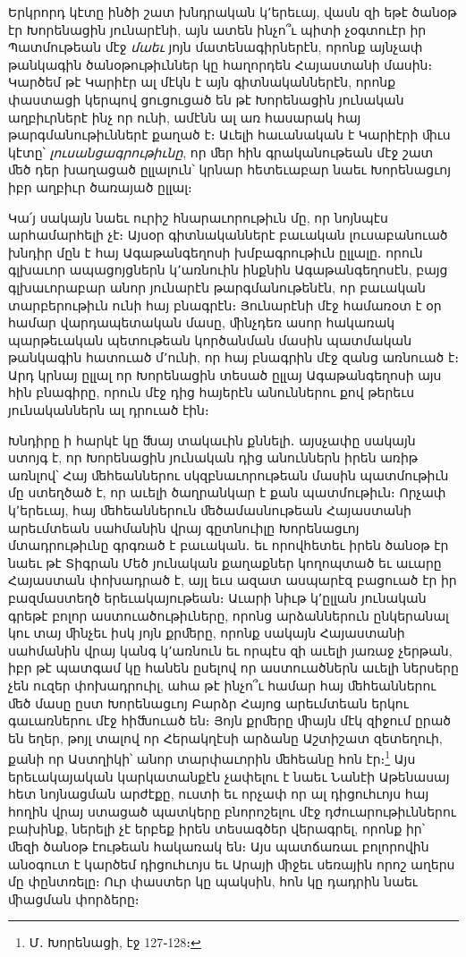 \documentclass{article}
\begin{document}
{Երկրորդ կէտը ինծի շատ խնդրական կ՚երեւայ, վասն զի եթէ ծանօթ էր Խորենացին յունարէնի, այն ատեն ինչո՞ւ պիտի չօգտուէր իր Պատմութեան մէջ \emph{մաեւ} յոյն մատենագիրներէն, որոնք այնչափ թանկագին ծանօթութիւններ կը հաղորդեն Հայաստանի մասին։ Կարծեմ թէ Կարիէր ալ մէկն է այն գիտնականներէն, որոնք փաստացի կերպով ցուցուցած են թէ Խորենացին յունական աղբիւրներէ ինչ որ ունի, ամէնն ալ առ հասարակ հայ թարգմանութիւններէ քաղած է։ Աւելի հաւանական է Կարիէրի ﬕւս կէտը՝ \emph{լուսանցագրութիւնը}, որ ﬔր հին գրականութեան մէջ շատ ﬔծ դեր խաղացած ըլլալուն՝ կրնար հետեւաբար նաեւ Խորենացւոյ իբր աղբիւր ծառայած ըլլալ։

Կա՛յ սակայն նաեւ ուրիշ հնարաւորութիւն մը, որ նոյնպէս արհամարհելի չէ։ Այսօր գիտնականներէ բաւական լուսաբանուած խնդիր մըն է հայ Ագաթանգեղոսի խմբագրութիւն ըլլալը․ որուն գլխաւոր ապացոյցներն կ՚առնուին ինքնին Ագաթանգեղոսէն, բայց գլխաւորաբար անոր յունարէն թարգմանութենէն, որ բաւական տարբերութիւն ունի հայ բնագրէն։ Յունարէնի մէջ համառօտ է օր համար վարդապետական մասը, ﬕնչդեռ ասոր հակառակ պարթեւական պետութեան կործանման մասին պատմական թանկագին հատուած մ՚ունի, որ հայ բնագրին մէջ զանց առնուած է։ Արդ կրնայ ըլլալ որ Խորենացին տեսած ըլլայ Ագաթանգեղոսի այս հին բնագիրը, որուն մէջ դից հայերէն անուններու քով թերեւս յունականներն ալ դրուած էին։

Խնդիրը ի հարկէ կը ﬓայ տակաւին քննելի․ այսչափը սակայն ստոյգ է, որ Խորենացին յունական դից անուններն իրեն առիթ առնլով՝ Հայ ﬔհեաններու սկզբնաւորութեան մասին պատմութիւն մը ստեղծած է, որ աւելի ծաղրանկար է քան պատմութիւն։ Որչափ կ՚երեւայ, հայ ﬔհեաններուն ﬔծամասնութեան Հայաստանի արեւմտեան սահմանին վրայ գըտնուիլը Խորենացւոյ մտադրութիւնը գրգռած է բաւական․ եւ որովհետեւ իրեն ծանօթ էր նաեւ թէ Տիգրան Մեծ յունական քաղաքներ կողոպտած եւ աւարը Հայաստան փոխադրած է, այլ եւս ազատ ասպարէզ բացուած էր իր բազմաստեղծ երեւակայութեան։ Աւարի նիւթ կ՚ըլլան յունական գրեթէ բոլոր աստուածութիւները, որոնց արձաններուն ընկերանալ կու տայ ﬕնչեւ իսկ յոյն քրﬔրը, որոնք սակայն Հայաստանի սահմանին վրայ կանգ կ՚առնուն եւ որպէս զի աւելի յառաջ չերթան, իբր թէ պատգամ կը հանեն ըսելով որ աստուածներն աւելի ներսերը չեն ուզեր փոխադրուիլ, ահա թէ ինչո՞ւ համար հայ ﬔհեաններու ﬔծ մասը ըստ Խորենացւոյ Բարձր Հայոց արեւմտեան երկու գաւառներու մէջ հիﬓուած են։ Յոյն քրﬔրը ﬕայն մէկ զիջում ըրած են եղեր, թոյլ տալով որ Հերակղէսի արձանը Աշտիշատ զետեղուի, քանի որ Աստղիկի՝ անոր տարփաւորին ﬔհեանը հոն էր։\footnote{Մ․ Խորենացի, էջ 127֊128։} Այս երեւակայական կարկատանքէն չափելու է նաեւ Նանէի Աթենասայ հետ նոյնացման արժէքը, ուստի եւ որչափ որ ալ դիցուհւոյս հայ հողին վրայ ստացած պատկերը բնորոշելու մէջ դժուարութիւններու բախինք, ներելի չէ երբեք իրեն տեսագծեր վերագրել, որոնք իր՝ ﬔզի ծանօթ էութեան հակառակ են։ Այս պատճառաւ բոլորովին անօգուտ է կարծեմ դիցուհւոյս եւ Արայի ﬕջեւ սեռային որոշ աղերս մը փընտռելը։ Ուր փաստեր կը պակսին, հոն կը դադրին նաեւ ﬕացման փորձերը։

}
\end{document}
